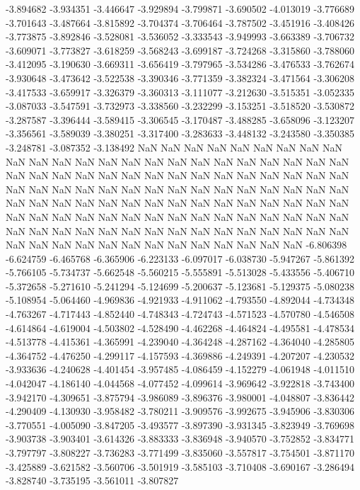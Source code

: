 -3.894682
-3.934351
-3.446647
-3.929894
-3.799871
-3.690502
-4.013019
-3.776689
-3.701643
-3.487664
-3.815892
-3.704374
-3.706464
-3.787502
-3.451916
-3.408426
-3.773875
-3.892846
-3.528081
-3.536052
-3.333543
-3.949993
-3.663389
-3.706732
-3.609071
-3.773827
-3.618259
-3.568243
-3.699187
-3.724268
-3.315860
-3.788060
-3.412095
-3.190630
-3.669311
-3.656419
-3.797965
-3.534286
-3.476533
-3.762674
-3.930648
-3.473642
-3.522538
-3.390346
-3.771359
-3.382324
-3.471564
-3.306208
-3.417533
-3.659917
-3.326379
-3.360313
-3.111077
-3.212630
-3.515351
-3.052335
-3.087033
-3.547591
-3.732973
-3.338560
-3.232299
-3.153251
-3.518520
-3.530872
-3.287587
-3.396444
-3.589415
-3.306545
-3.170487
-3.488285
-3.658096
-3.123207
-3.356561
-3.589039
-3.380251
-3.317400
-3.283633
-3.448132
-3.243580
-3.350385
-3.248781
-3.087352
-3.138492
NaN
NaN
NaN
NaN
NaN
NaN
NaN
NaN
NaN
NaN
NaN
NaN
NaN
NaN
NaN
NaN
NaN
NaN
NaN
NaN
NaN
NaN
NaN
NaN
NaN
NaN
NaN
NaN
NaN
NaN
NaN
NaN
NaN
NaN
NaN
NaN
NaN
NaN
NaN
NaN
NaN
NaN
NaN
NaN
NaN
NaN
NaN
NaN
NaN
NaN
NaN
NaN
NaN
NaN
NaN
NaN
NaN
NaN
NaN
NaN
NaN
NaN
NaN
NaN
NaN
NaN
NaN
NaN
NaN
NaN
NaN
NaN
NaN
NaN
NaN
NaN
NaN
NaN
NaN
NaN
NaN
NaN
NaN
NaN
NaN
NaN
NaN
NaN
NaN
NaN
NaN
NaN
NaN
NaN
NaN
NaN
NaN
NaN
NaN
NaN
NaN
NaN
NaN
NaN
NaN
NaN
NaN
NaN
NaN
NaN
NaN
NaN
-6.806398
-6.624759
-6.465768
-6.365906
-6.223133
-6.097017
-6.038730
-5.947267
-5.861392
-5.766105
-5.734737
-5.662548
-5.560215
-5.555891
-5.513028
-5.433556
-5.406710
-5.372658
-5.271610
-5.241294
-5.124699
-5.200637
-5.123681
-5.129375
-5.080238
-5.108954
-5.064460
-4.969836
-4.921933
-4.911062
-4.793550
-4.892044
-4.734348
-4.763267
-4.717443
-4.852440
-4.748343
-4.724743
-4.571523
-4.570780
-4.546508
-4.614864
-4.619004
-4.503802
-4.528490
-4.462268
-4.464824
-4.495581
-4.478534
-4.513778
-4.415361
-4.365991
-4.239040
-4.364248
-4.287162
-4.364040
-4.285805
-4.364752
-4.476250
-4.299117
-4.157593
-4.369886
-4.249391
-4.207207
-4.230532
-3.933636
-4.240628
-4.401454
-3.957485
-4.086459
-4.152279
-4.061948
-4.011510
-4.042047
-4.186140
-4.044568
-4.077452
-4.099614
-3.969642
-3.922818
-3.743400
-3.942170
-4.309651
-3.875794
-3.986089
-3.896376
-3.980001
-4.048807
-3.836442
-4.290409
-4.130930
-3.958482
-3.780211
-3.909576
-3.992675
-3.945906
-3.830306
-3.770551
-4.005090
-3.847205
-3.493577
-3.897390
-3.931345
-3.823949
-3.769698
-3.903738
-3.903401
-3.614326
-3.883333
-3.836948
-3.940570
-3.752852
-3.834771
-3.797797
-3.808227
-3.736283
-3.771499
-3.835060
-3.557817
-3.754501
-3.871170
-3.425889
-3.621582
-3.560706
-3.501919
-3.585103
-3.710408
-3.690167
-3.286494
-3.828740
-3.735195
-3.561011
-3.807827
